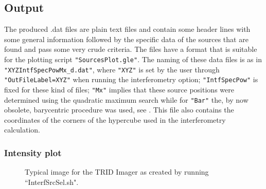 \subsection{Output}

The produced .dat files are plain text files and contain some header lines with some general information followed by the specific data of the sources that are found and pass some very crude criteria. The files have a format that is suitable for the plotting script \verb!"SourcesPlot.gle"!. The naming of these data files is as in \verb!"XYZIntfSpecPowMx_d.dat"!, where \verb!"XYZ"! is set by the user through \verb!"OutFileLabel=XYZ"! when running the interferometry option; \verb!"IntfSpecPow"! is fixed for these kind of files; \verb!"Mx"! implies that these source positions were determined using the quadratic maximum search while for \verb!"Bar"! the, by now obsolete, barycentric procedure was used, see .
This file also contains the coordinates of the corners of the hypercube used in the interferometry calculation.


\subsubsection{Intensity plot}

\begin{figure}[th]
	\caption{Typical image for the TRID Imager as created by running ``InterfSrcSel.sh".}	 
\end{figure}

